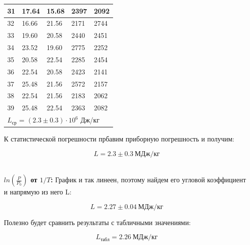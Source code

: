 \begin{table}[h!]
\begin{tabular}{|l|l|l|l|l|}
31 & 17.64                      & 15.68                        & 2397             & 2092               \\ \hline
32 & 16.66                      & 21.56                        & 2171             & 2744               \\ \hline
33 & 19.60                      & 20.58                        & 2440             & 2451               \\ \hline
34 & 23.52                      & 19.60                        & 2775             & 2252               \\ \hline
35 & 20.58                      & 22.54                        & 2285             & 2454               \\ \hline
36 & 22.54                      & 20.58                        & 2423             & 2141               \\ \hline
37 & 25.48                      & 21.56                        & 2572             & 2157               \\ \hline
38 & 22.54                      & 21.56                        & 2183             & 2062               \\ \hline
39 & 25.48                      & 22.54                        & 2363             & 2082               \\ \hline
\multicolumn{5}{|l|}{$L_{ср}$ = $(2.3 \pm 0.3) \cdot 10 ^{6}$ Дж/кг}                                  \\ \hline
\end{tabular}
\end{table}

К статистической погрешности прбавим приборную погрешность и получим:

\begin{equation*}
L = 2.3 \pm 0.3  \: МДж/кг
\end{equation*}

\\

\textbf{$ln(\frac{P}{P_0})$ от $1/T$:} График и так линеен, поэтому найдем его угловой коэффициент и напрямую из него L:

\begin{equation*}
L = 2.27 \pm 0.04 \: МДж/кг
\end{equation*}

Полезно будет сравнить результаты с табличными значениями:

\begin{equation*}
L_{табл} = 2.26 \: МДж/кг
\end{equation*}







